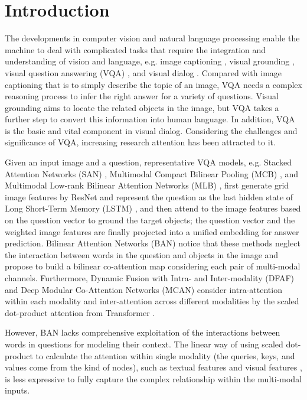 \documentclass[10pt,twocolumn,letterpaper]{article}
\begin{document}
\section{Introduction}
The developments in computer vision and natural language processing enable the machine to deal with complicated tasks that require the integration and understanding of vision and language, e.g. image captioning \cite{anderson2018bottom}, visual grounding \cite{yu2018rethinking, fukui2016multimodal}, visual question answering (VQA) \cite{antol2015vqa, gao2019dynamic, yu2019deep}, and visual dialog \cite{das2017visual, guo2019image}. Compared with image captioning that is to simply describe the topic of an image, VQA needs a complex reasoning process to infer the right answer for a variety of questions. Visual grounding aims to locate the related objects in the image, but VQA takes a further step to convert this information into human language. In addition, VQA is the basic and vital component in visual dialog. Considering the challenges and significance of VQA, increasing research attention has been attracted to it. 

Given an input image and a question, representative VQA models, e.g. Stacked Attention Networks (SAN) \cite{yang2016stacked}, Multimodal Compact Bilinear Pooling (MCB) \cite{fukui2016multimodal}, and Multimodal Low-rank Bilinear Attention Networks (MLB) \cite{kim2016hadamard}, first generate grid image features by ResNet \cite{he2016deep} and represent the question as the last hidden state of Long Short-Term Memory (LSTM) \cite{hochreiter1997long}, and then attend to the image features based on the question vector to ground the target objects; the question vector and the weighted image features are finally projected into a unified embedding for answer prediction. Bilinear Attention Networks (BAN) \cite{kim2018bilinear} notice that these methods neglect the interaction between words in the question and objects in the image and propose to build a bilinear co-attention map considering each pair of multi-modal channels. Furthermore, Dynamic Fusion with Intra- and Inter-modality (DFAF) \cite{gao2019dynamic} and Deep Modular Co-Attention Networks (MCAN) \cite{yu2019deep} consider intra-attention within each modality and inter-attention across different modalities by the scaled dot-product attention from Transformer \cite{vaswani2017attention}. 

However, BAN lacks comprehensive exploitation of the interactions between words in questions for modeling their context. The linear way of using scaled dot-product to calculate the attention within single modality (the queries, keys, and values come from the kind of nodes), such as textual features \cite{vaswani2017attention, devlin2018bert} and visual features \cite{chen2019graph, yang2018graph}, is less expressive to fully capture the complex relationship within the multi-modal inputs.
\end{document}

